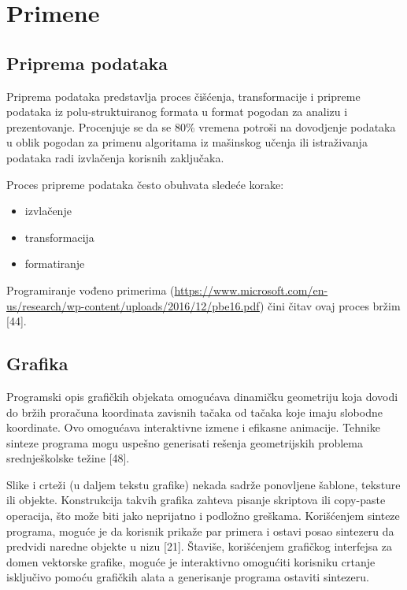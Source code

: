 \section{Primene}
\label{sec:Primene}

\subsection{Priprema podataka}
\label{subsec:PripremaPodataka}

Priprema podataka predstavlja proces čišćenja, transformacije i pripreme podataka iz polu-struktuiranog formata u format pogodan za analizu i prezentovanje. Procenjuje se da se 80\% vremena potroši na dovodjenje podataka u oblik pogodan za primenu algoritama iz mašinskog učenja ili istraživanja podataka radi izvlačenja korisnih zaključaka.

Proces pripreme podataka često obuhvata sledeće korake:
\begin{itemize}
  \item izvlačenje
  \item transformacija
  \item formatiranje
\end{itemize}

Programiranje vođeno primerima  (\url{https://www.microsoft.com/en-us/research/wp-content/uploads/2016/12/pbe16.pdf}) čini čitav ovaj proces bržim [44].


\subsection{Grafika}
\label{subsec:Grafika}

Programski opis grafičkih objekata omogućava dinamičku geometriju koja dovodi do bržih proračuna koordinata zavisnih tačaka od tačaka koje imaju slobodne koordinate. Ovo omogućava interaktivne izmene i efikasne animacije. Tehnike sinteze programa mogu uspešno generisati rešenja geometrijskih problema srednješkolske težine [48].

Slike i crteži (u daljem tekstu grafike) nekada sadrže ponovljene šablone, teksture ili objekte. Konstrukcija takvih grafika zahteva pisanje skriptova ili copy-paste operacija, što može biti jako neprijatno i podložno greškama. Korišćenjem sinteze programa, moguće je da korisnik prikaže par primera i ostavi posao sintezeru da predvidi naredne objekte u nizu [21]. Štaviše, korišćenjem grafičkog interfejsa za domen vektorske grafike, moguće je interaktivno omogućiti korisniku crtanje isključivo pomoću grafičkih alata a generisanje programa ostaviti sintezeru.


